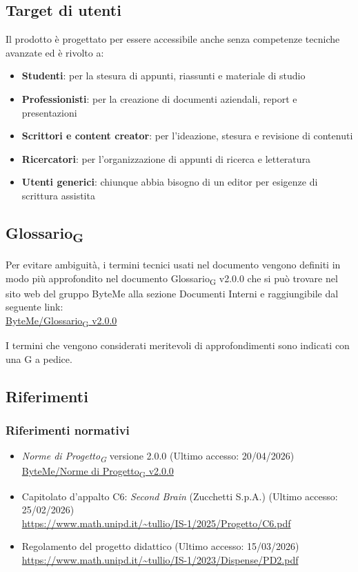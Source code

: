 \documentclass[11pt,a4paper]{article}
\newcommand{\gls}[1]{#1\textsubscript{G}}
\begin{document}
\subsection{Target di utenti}
Il prodotto è progettato per essere accessibile anche senza competenze tecniche avanzate ed è rivolto a:
\begin{itemize}
    \item \textbf{Studenti}: per la stesura di appunti, riassunti e materiale di studio
    \item \textbf{Professionisti}: per la creazione di documenti aziendali, report e presentazioni
    \item \textbf{Scrittori e content creator}: per l'ideazione, stesura e revisione di contenuti
    \item \textbf{Ricercatori}: per l'organizzazione di appunti di ricerca e letteratura
    \item \textbf{Utenti generici}: chiunque abbia bisogno di un editor per esigenze di scrittura assistita
\end{itemize}


\subsection{\gls{Glossario}}
Per evitare ambiguità, i termini tecnici usati nel documento vengono definiti in modo più approfondito nel documento \gls{Glossario} v2.0.0 che si può trovare nel sito web del gruppo ByteMe alla sezione Documenti Interni e raggiungibile dal seguente link:\\
\href{https://byteme25.github.io/ByteMe/files.html}{ByteMe/\gls{Glossario} v2.0.0}

I termini che vengono considerati meritevoli di approfondimenti sono indicati con una G a pedice.


\subsection{Riferimenti}
\subsubsection{Riferimenti normativi}
\begin{itemize}
  \item \textit{\gls{Norme di Progetto}} versione 2.0.0 (Ultimo accesso: 20/04/2026)\\
  \href{https://byteme25.github.io/ByteMe/files.html}{ByteMe/\gls{Norme di Progetto} v2.0.0}
  \item Capitolato d'appalto C6: \textit{Second Brain} (Zucchetti S.p.A.) (Ultimo accesso: 25/02/2026)\\ 
  \url{https://www.math.unipd.it/~tullio/IS-1/2025/Progetto/C6.pdf}
  \item Regolamento del progetto didattico (Ultimo accesso: 15/03/2026)\\
        \url{https://www.math.unipd.it/~tullio/IS-1/2023/Dispense/PD2.pdf}
\end{itemize}
\end{document}
